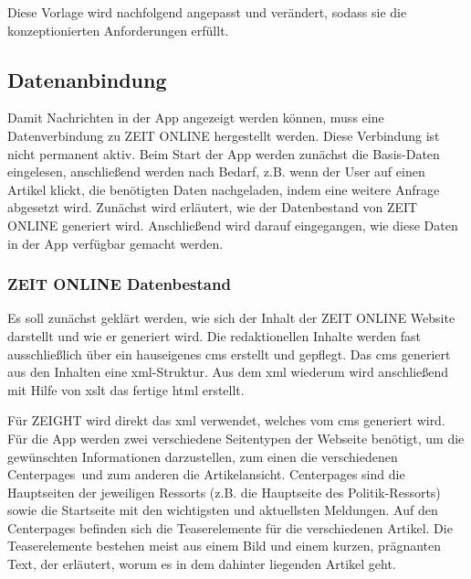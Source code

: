 \documentclass[12pt,a4paper,bibtotoc,abstracton]{scrartcl}
\begin{document}
Diese Vorlage wird nachfolgend angepasst und verändert, sodass sie die konzeptionierten Anforderungen erfüllt.

\subsection{Datenanbindung}
\label{subsec:datenanbindung}
Damit Nachrichten in der App angezeigt werden können, muss eine Datenverbindung zu ZEIT ONLINE hergestellt werden. Diese Verbindung ist nicht permanent aktiv. Beim Start der App werden zunächst die Basis-Daten eingelesen, anschließend werden nach Bedarf, z.B. wenn der User auf einen Artikel klickt, die benötigten Daten nachgeladen, indem eine weitere Anfrage abgesetzt wird. Zunächst wird erläutert, wie der Datenbestand von ZEIT ONLINE generiert wird. Anschließend wird darauf eingegangen, wie diese Daten in der App verfügbar gemacht werden.

\subsubsection{ZEIT ONLINE Datenbestand}
\label{subsubsec:zondatenbestand}
Es soll zunächst geklärt werden, wie sich der Inhalt der ZEIT ONLINE Website darstellt und wie er generiert wird. Die redaktionellen Inhalte werden fast ausschließlich über ein hauseigenes \ac{cms} erstellt und gepflegt. Das \ac{cms} generiert aus den Inhalten eine \ac{xml}-Struktur. Aus dem \ac{xml} wiederum wird anschließend mit Hilfe von \ac{xslt} das fertige \ac{html} erstellt.

Für ZEIGHT wird direkt das \ac{xml} verwendet, welches vom \ac{cms} generiert wird. Für die App werden zwei verschiedene Seitentypen der Webseite benötigt, um die gewünschten Informationen darzustellen, zum einen die verschiedenen \glqq Centerpages\grqq\ und zum anderen die Artikelansicht. Centerpages sind die Hauptseiten der jeweiligen Ressorts (z.B. die Hauptseite des Politik-Ressorts) sowie die Startseite mit den wichtigsten und aktuellsten Meldungen. Auf den Centerpages befinden sich die Teaserelemente für die verschiedenen Artikel. Die Teaserelemente bestehen meist aus einem Bild und einem kurzen, prägnanten Text, der erläutert, worum es in dem dahinter liegenden Artikel geht.\\

\begin{minipage}{\linewidth}

\end{minipage}
\end{document}
